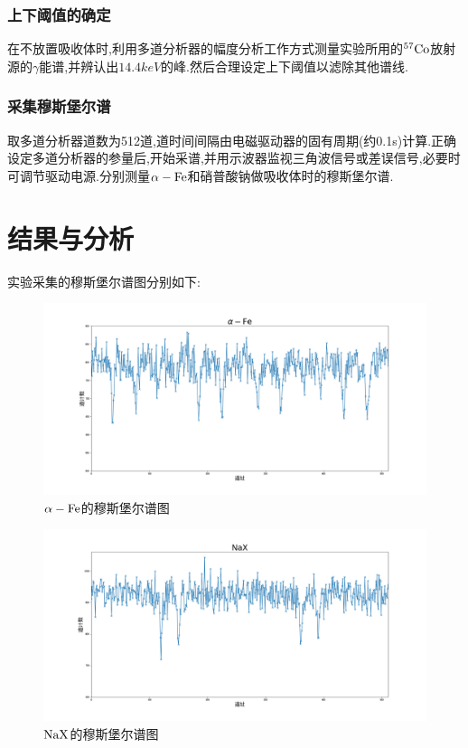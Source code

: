 \documentclass[aps,pre,12pt,preprint,onecolumn,showpacs,showkeys]{revtex4-1}
\begin{document}
\subsubsection{上下阈值的确定}
在不放置吸收体时,利用多道分析器的幅度分析工作方式测量实验所用的$^{57}\rm{Co}$放射源的$\gamma$能谱,并辨认出$\si{\num{14.4}keV}$的峰.然后合理设定上下阈值以滤除其他谱线.
\subsubsection{采集穆斯堡尔谱}
取多道分析器道数为512道,道时间间隔由电磁驱动器的固有周期(约0.1s)计算.正确设定多道分析器的参量后,开始采谱,并用示波器监视三角波信号或差误信号,必要时可调节驱动电源.分别测量$\alpha-\rm{Fe}$和硝普酸钠做吸收体时的穆斯堡尔谱.
\section{结果与分析}
实验采集的穆斯堡尔谱图分别如下:\par
\begin{figure}[htbp]
    \centering
    \includegraphics[width=\textwidth]{Exp_1/Fe.png}
    \caption{$\alpha-\rm{Fe}$的穆斯堡尔谱图}
    \label{fig:2}
\end{figure}
\begin{figure}[htbp]
    \centering
    \includegraphics[width=\textwidth]{Exp_1/NaX.png}
    \caption{$\rm{NaX}$的穆斯堡尔谱图}
    \label{fig:3}
\end{figure}
\end{document}
